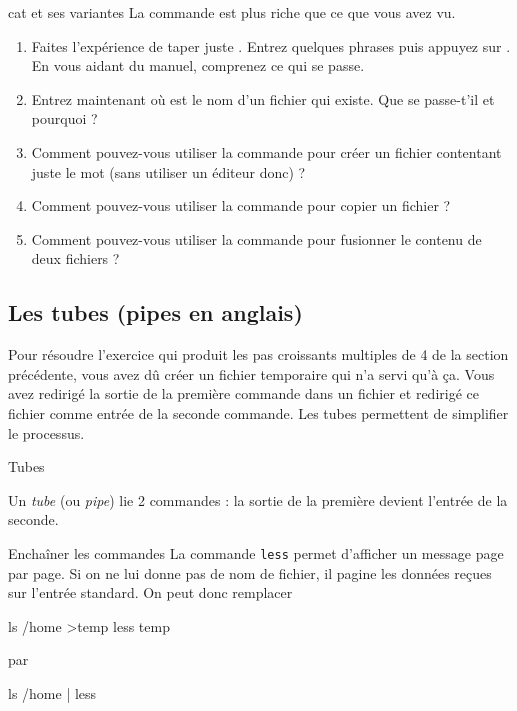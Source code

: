 \documentclass[a4paper,11pt]{style-esi/td}
\begin{document}
		\begin{Exercice}{cat et ses variantes}
			La commande  est plus riche que ce que vous avez vu.
			\begin{enumerate}
			\item 
				Faites l'expérience de taper juste .
				Entrez quelques phrases puis appuyez sur .
				En vous aidant du manuel, comprenez ce qui se passe.
			\item 
				Entrez maintenant  
				où  est le nom d'un fichier qui existe.
				Que se passe-t'il et pourquoi ?
			\item 
				Comment pouvez-vous utiliser la commande 
				pour créer un fichier contentant juste le mot 
				(sans utiliser un éditeur donc) ?
			\item 
				Comment pouvez-vous utiliser la commande 
				pour copier un fichier ?
			\item 
				Comment pouvez-vous utiliser la commande 
				pour fusionner le contenu de deux fichiers ?
			\end{enumerate}
		\end{Exercice}

    \subsection{Les tubes (pipes en anglais)}

		Pour résoudre l'exercice 
		qui produit les pas croissants multiples de 4 de la section précédente, 
		vous avez dû créer un fichier temporaire qui n'a servi qu'à \c ca. 
		Vous avez redirigé la sortie de la première commande dans un fichier 
		et redirigé ce fichier comme entrée de la seconde commande.
		Les tubes permettent de simplifier le processus.
						
		\begin{theorie}{Tubes}

			\medskip
			Un \emph{tube} (ou \emph{pipe}) lie 2 commandes :
			la sortie de la première devient l'entrée de la seconde.
		\end{theorie}
			
		\begin{Exemple}{Enchaîner les commandes} 
			La commande \verb_less_ permet d'afficher un message page par page.
			Si on ne lui donne pas de nom de fichier, il pagine les données reçues sur l'entrée standard. 
			On peut donc remplacer
					
			\begin{Console}
				ls /home >temp
				less temp
			\end{Console}
			par					
			\begin{Console}
				ls /home | less
			\end{Console}	
		\end{Exemple}
			
\end{document}
